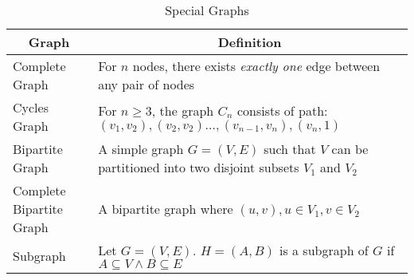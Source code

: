 \documentclass{MathNotes}
\newenvironment{graph}{\begin{tikzpicture}[node distance={0.65in}, thick, auto=center,every node/.style={draw,circle,fill=green!10}]}{\end{tikzpicture}}
\begin{document}
\newpage
\begin{table}[h!]
	\centering
	\caption{Special Graphs}
	\begin{tabular}{ll}
		\multicolumn{1}{c}{\textbf{Graph}} &
		\multicolumn{1}{c}{\textbf{Definition}}                                                                          \\
		\midrule
		Complete Graph                     &
		For $n$ nodes, there exists \textit{exactly one} edge between any
		pair of nodes                                                                                                    \\
		Cycles Graph                       &
		\parbox{30em}{For $n\geq3$, the graph $C_n$ consists of path: $(v_1,v_2),(v_2,v_2)\ldots,(v_{n-1},v_n),(v_n,1)$} \\
		Bipartite Graph                    &
		\parbox{30em}{A simple graph $G=(V,E)$ such that $V$ can be partitioned into
		two disjoint subsets $V_1$ and $V_2$}                                                                            \\
		Complete Bipartite Graph           &
		\parbox{30em}{A bipartite graph where $(u,v), u\in V_1,v\in V_2$}                                                \\
		Subgraph                           & Let $G=(V,E)$. $H=(A,B)$ is a subgraph of $G$ if
		$A\subseteq V\land B\subseteq E$
	\end{tabular}
\end{table}
\end{document}
